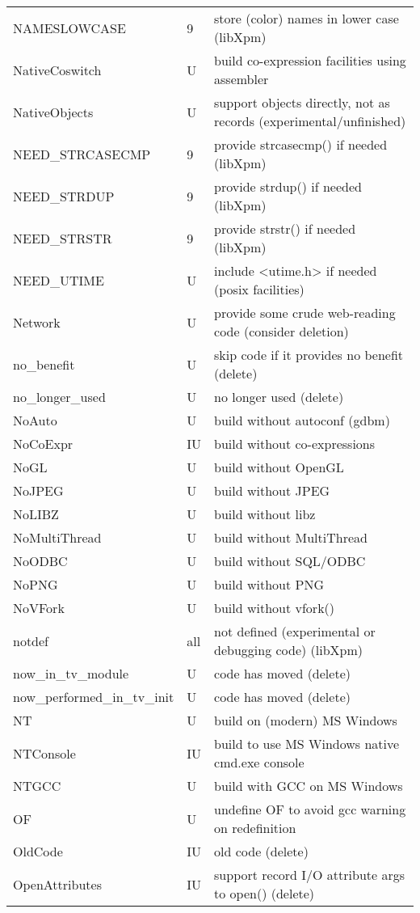 \begin{xtabular}{|m{1.8in}|m{0.5in}|m{4.0in}|}
NAMESLOWCASE & 9 & store (color) names in lower case (libXpm) \\
NativeCoswitch & U & build co-expression facilities using assembler \\
NativeObjects & U & support objects directly, not as records (experimental/unfinished) \\
NEED\_STRCASECMP & 9 & provide strcasecmp() if needed (libXpm) \\
NEED\_STRDUP & 9 & provide strdup() if needed (libXpm) \\
NEED\_STRSTR & 9 & provide strstr() if needed (libXpm) \\
NEED\_UTIME & U & include <utime.h> if needed (posix facilities) \\
Network & U & provide some crude web-reading code (consider deletion) \\
no\_benefit & U & skip code if it provides no benefit (delete) \\
no\_longer\_used & U & no longer used (delete) \\
NoAuto & U & build without autoconf (gdbm) \\
NoCoExpr & IU & build without co-expressions \\
NoGL & U & build without OpenGL \\
NoJPEG & U & build without JPEG \\
NoLIBZ & U & build without libz \\
NoMultiThread & U & build without MultiThread \\
NoODBC & U & build without SQL/ODBC \\
NoPNG & U & build without PNG \\
NoVFork & U & build without vfork() \\
notdef & all & not defined (experimental or debugging code) (libXpm) \\
now\_in\_tv\_module & U & code has moved (delete) \\
now\_performed\_in\_tv\_init & U & code has moved (delete) \\
NT & U & build on (modern) MS Windows \\
NTConsole & IU & build to use MS Windows native cmd.exe console \\
NTGCC & U & build with GCC on MS Windows \\
OF & U & undefine OF to avoid gcc warning on redefinition \\
OldCode & IU & old code (delete) \\
OpenAttributes & IU & support record I/O attribute args to open() (delete) \\

\end{xtabular}
